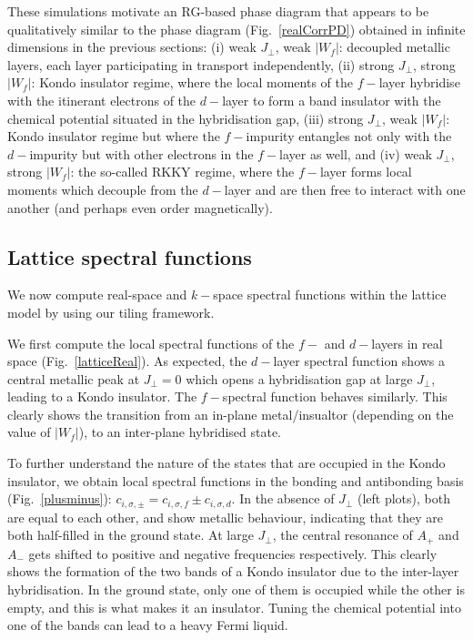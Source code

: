 \documentclass[%
reprint,
superscriptaddress,
groupedaddress,
superscriptaddress,
onecolumn,
10pt
]{revtex4-2}
\begin{document}
These simulations motivate an RG-based phase diagram that appears to be qualitatively similar to the phase diagram (Fig.~\ref{realCorrPD}) obtained in infinite dimensions in the previous sections: (i) weak \(J_\perp\), weak \(|W_f|\): decoupled metallic layers, each layer participating in transport independently, (ii) strong \(J_\perp\), strong \(|W_f|\): Kondo insulator regime, where the local moments of the \(f-\)layer hybridise with the itinerant electrons of the \(d-\)layer to form a band insulator with the chemical potential situated in the hybridisation gap, (iii) strong \(J_\perp\), weak \(|W_f|\): Kondo insulator regime but where the \(f-\)impurity entangles not only with the \(d-\)impurity but with other electrons in the \(f-\)layer as well, and (iv) weak \(J_\perp\), strong \(|W_f|\): the so-called RKKY regime, where the \(f-\)layer forms local moments which decouple from the \(d-\)layer and are then free to interact with one another (and perhaps even order magnetically).

\subsection{Lattice spectral functions}
We now compute real-space and \(k-\)space spectral functions within the lattice model by using our tiling framework. 

We first compute the local spectral functions of the \(f-\) and \(d-\)layers in real space (Fig.~\ref{latticeReal}). As expected, the \(d-\)layer spectral function shows a central metallic peak at \(J_\perp=0\) which opens a hybridisation gap at large \(J_\perp\), leading to a Kondo insulator. The \(f-\)spectral function behaves similarly. This clearly shows the transition from an in-plane metal/insualtor (depending on the value of \(|W_f|\)), to an inter-plane hybridised state.

To further understand the nature of the states that are occupied in the Kondo insulator, we obtain local spectral functions in the bonding and antibonding basis (Fig.~\ref{plusminus}): \(c_{i,\sigma,\pm} = c_{i,\sigma,f} \pm c_{i,\sigma,d}\). In the absence of \(J_\perp\) (left plots), both are equal to each other, and show metallic behaviour, indicating that they are both half-filled in the ground state. At large \(J_\perp\), the central resonance of \(A_+\) and \(A_-\) gets shifted to positive and negative frequencies respectively. This clearly shows the formation of the two bands of a Kondo insulator due to the inter-layer hybridisation. In the ground state, only one of them is occupied while the other is empty, and this is what makes it an insulator. Tuning the chemical potential into one of the bands can lead to a heavy Fermi liquid.
\end{document}
